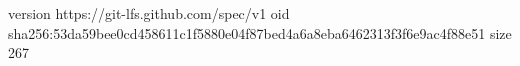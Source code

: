 version https://git-lfs.github.com/spec/v1
oid sha256:53da59bee0cd458611c1f5880e04f87bed4a6a8eba6462313f3f6e9ac4f88e51
size 267
